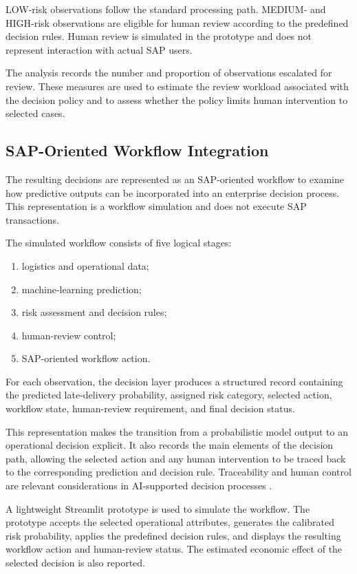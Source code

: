 \documentclass[manuscript, screen, review]{acmart}
\begin{document}
LOW-risk observations follow the standard processing path. MEDIUM- and
HIGH-risk observations are eligible for human review according to the
predefined decision rules. Human review is simulated in the prototype
and does not represent interaction with actual SAP users.

The analysis records the number and proportion of observations
escalated for review. These measures are used to estimate the review
workload associated with the decision policy and to assess whether the
policy limits human intervention to selected cases.

\subsection{SAP-Oriented Workflow Integration}

The resulting decisions are represented as an SAP-oriented workflow to
examine how predictive outputs can be incorporated into an enterprise
decision process. This representation is a workflow simulation and
does not execute SAP transactions.

The simulated workflow consists of five logical stages:

\begin{enumerate}
\item logistics and operational data;
\item machine-learning prediction;
\item risk assessment and decision rules;
\item human-review control;
\item SAP-oriented workflow action.
\end{enumerate}

For each observation, the decision layer produces a structured record
containing the predicted late-delivery probability, assigned risk
category, selected action, workflow state, human-review requirement,
and final decision status.

This representation makes the transition from a probabilistic model
output to an operational decision explicit. It also records the main
elements of the decision path, allowing the selected action and any
human intervention to be traced back to the corresponding prediction
and decision rule. Traceability and human control are relevant
considerations in AI-supported decision processes
\cite{amershi2019guidelines,shneiderman2020human}.

A lightweight Streamlit prototype is used to simulate the workflow.
The prototype accepts the selected operational attributes, generates
the calibrated risk probability, applies the predefined decision
rules, and displays the resulting workflow action and human-review
status. The estimated economic effect of the selected decision is also
reported.
\end{document}
